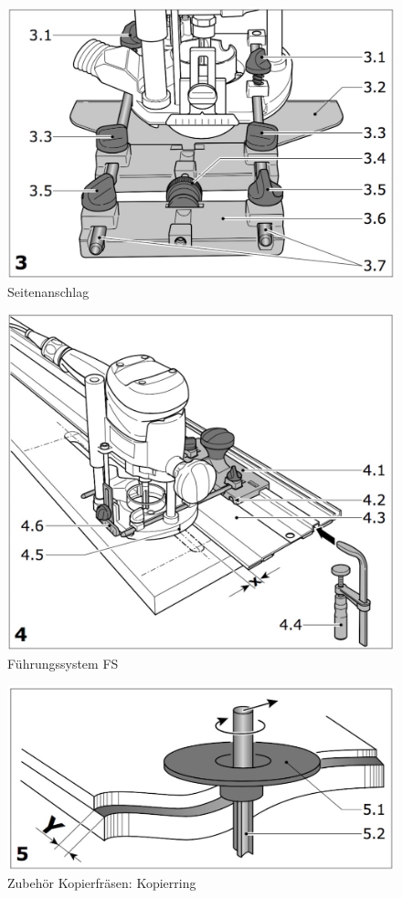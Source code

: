 \documentclass{\basedir/fablab-document}
\begin{document}
\begin{figure}[]
	\centering
	\includegraphics[width=1\textwidth]{img/festool_5.jpg}
	\caption{Seitenanschlag}
	\label{fig:bilder4}
\end{figure}

\begin{figure}[]
	\centering
	\includegraphics[width=1\textwidth]{img/festool_6.jpg}
	\caption{Führungssystem FS}
	\label{fig:bilder5}
\end{figure}

\begin{figure}[]
	\centering
	\includegraphics[width=1\textwidth]{img/festool_7.jpg}
	\caption{Zubehör Kopierfräsen: Kopierring}
	\label{fig:bilder6}
\end{figure}
\end{document}

